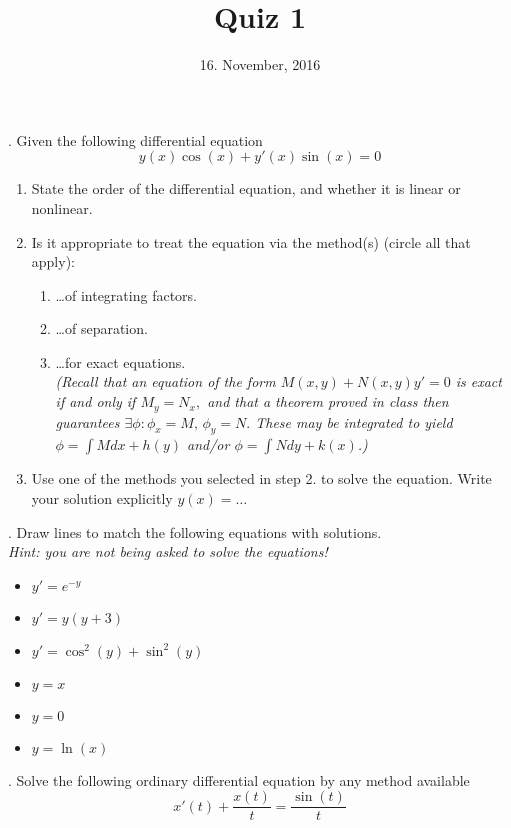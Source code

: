 \documentclass[10pt,a4paper]{article}
\title{Quiz 1}
\date{16. November, 2016}
\begin{document}
\maketitle

\thispagestyle{empty}

. Given the following differential equation 
\[ y(x) \cos(x) + y'(x) \sin(x) = 0 \]
\begin{enumerate}
\item State the order of the differential equation, and whether it is linear or nonlinear. \vspace{2em}
\item Is it appropriate to treat the equation via the method(s) (circle all that apply):
\begin{enumerate}
\item \ldots of integrating factors.
\item \ldots of separation.
\item \ldots for exact equations. \\
\emph{(Recall that an equation of the form $M(x,y) + N(x,y)y' = 0$ is exact if and only if $M_y = N_x,$ and that a theorem proved in class then guarantees $\exists \phi: \phi_x = M, \, \phi_y = N.$ These may be integrated to yield  $\phi = \int M dx + h(y)$ and/or $\phi = \int N dy + k(x)$.)}
\vspace{2em}
\end{enumerate}
\item Use one of the methods you selected in step 2. to solve the equation.  Write your solution explicitly $y(x) = \ldots$
\end{enumerate}
\vspace{3em}

. Draw lines to match the following equations with solutions. \\
\emph{Hint: you are not being asked to solve the equations!}
\begin{multicols}{2}
\begin{itemize}
\item $y' = e^{-y}$
\item $y' = y(y+3)$
\item $y' = \cos^2(y) + \sin^2(y)$ 
\item $ y = x$
\item $y = 0$
\item $ y = \ln(x)$
\end{itemize}
\end{multicols}

. Solve the following ordinary differential equation by any method available
\[ x'(t) + \frac{x(t)}{t} = \frac{\sin(t)}{t} \]
\end{document}
